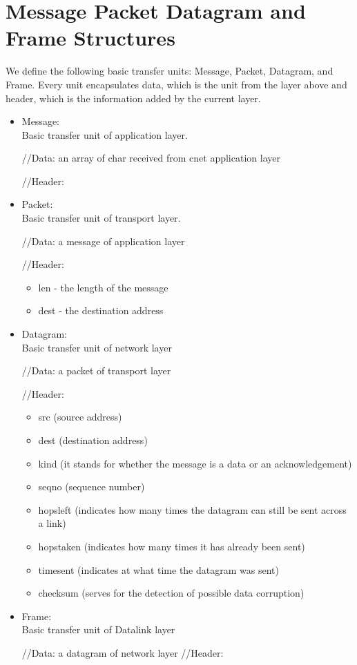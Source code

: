 \documentclass{article}
\begin{document}
\section{Message Packet Datagram and Frame Structures}
We define the following basic transfer units: Message, Packet, Datagram, and
Frame. Every unit encapsulates data, which is the unit from the layer above and
header, which is the information added by the current layer. 

\begin{itemize}
  \item Message: \\
  Basic transfer unit of application layer. 
  
  //Data:  an array of char received from cnet application layer
  
  //Header:
  \item Packet: \\
  Basic transfer unit of transport layer. 
  
  //Data:  a message of application layer
  
  //Header:  
  \begin{itemize}
    \item len - the length of the message
    \item dest - the destination address
    \end{itemize}
  
  \item Datagram: \\
   Basic transfer unit of network layer
   
   //Data: a packet of transport layer
   
   //Header: 
   \begin{itemize}
     \item src (source address)
     \item dest (destination address)
     \item kind (it stands for whether the message is a data 
     or an acknowledgement)
     \item seqno (sequence number)
     \item hopsleft (indicates how many times the datagram 
     can still be sent across a link)
     \item hopstaken  (indicates how many times it has already been sent)
    \item timesent (indicates at what time the datagram was sent)
   \item checksum (serves for the detection of possible data corruption)
\end{itemize}

\item Frame: \\

 Basic transfer unit of Datalink layer
 
 //Data: a datagram of network layer
 //Header:
 \end{itemize}
\end{document}
